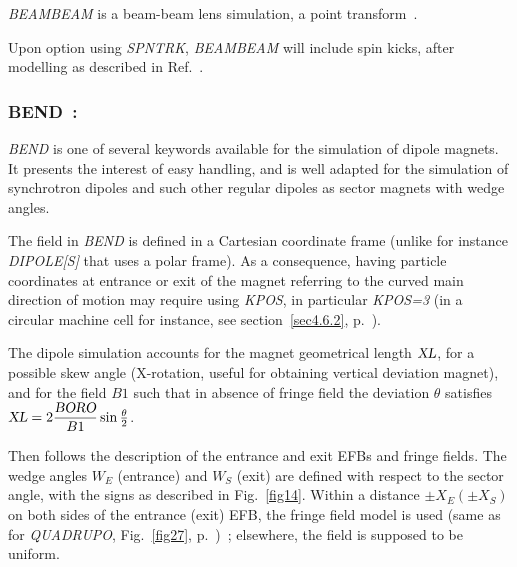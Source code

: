 {\textsl{BEAMBEAM} is a beam-beam lens simulation, a point transform~\cite{BBSW}. 

\medskip 

\noindent Upon option using \textsl{SPNTRK}, 
\textsl{BEAMBEAM} will include spin kicks, after  modelling as described in Ref.~\cite{YKBatyginSpin}. 



\newpage


\subsubsection*{BEND~: \BENDTitl}\label{BEND}  
\medskip

\textsl{BEND}  is one of  several keywords available for the
simulation of dipole magnets. It presents the interest of easy handling, and is well adapted for 
the simulation of synchrotron dipoles and such other regular dipoles as sector magnets with wedge 
angles. 

\bigskip

\noindent The field in \textsl{BEND}  is defined in a Cartesian coordinate frame (unlike for instance \textsl{DIPOLE[S]} 
that uses a polar frame).  As a consequence, having particle coordinates at entrance  or exit of the magnet 
referring to the  curved  main direction of motion may 
require using \textsl{KPOS}, in particular \textsl{KPOS=3}  (in a circular machine cell for instance, 
see section~\ref{sec4.6.2}, p.~\pageref{sec4.6.2}). 

\bigskip

\noindent The dipole simulation accounts for the magnet geometrical length $ \textsl{XL} $, for a possible 
 skew angle (X-rotation, useful for obtaining vertical deviation magnet), and for the 
field $ B1 $  such that   in absence of fringe field the deviation $\theta$ satisfies 
$ \textsl{XL} = 2 \dfrac{\textsl{BORO}}{B1} \sin \frac{\theta}{2}$. 

\bigskip

\noindent Then follows the description of the entrance and exit EFBs and
fringe fields.       The wedge angles $W_E $ 
(entrance) and $W_S $ (exit) are defined with respect to the sector angle, 
with the signs as described in Fig.~\ref{fig14}.  
Within a distance $ \pm X_E(\pm X_S) $ on both sides of the entrance (exit) EFB, 
the fringe field model is used (same as for \textsl{QUADRUPO}, 
Fig.~\ref{fig27}, p.~\pageref{fig27})~; elsewhere, the field is supposed to be uniform. 

\bigskip

}
